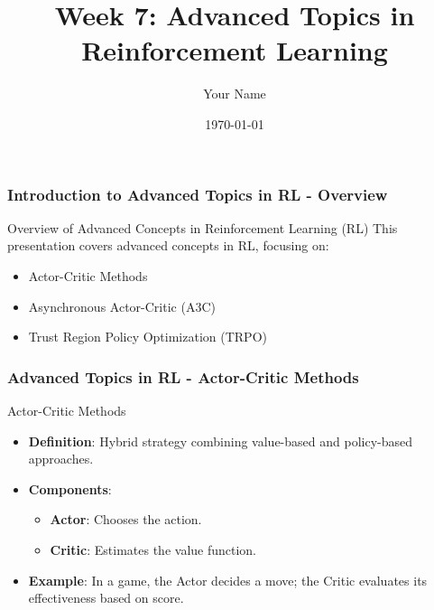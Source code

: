 \documentclass{beamer}
\title{Week 7: Advanced Topics in Reinforcement Learning}
\author{Your Name}
\institute{Your Institution}
\date{\today}
\begin{document}
\frame{\titlepage}

\begin{frame}[fragile]
    \frametitle{Introduction to Advanced Topics in RL - Overview}
    \begin{block}{Overview of Advanced Concepts in Reinforcement Learning (RL)}
        This presentation covers advanced concepts in RL, focusing on:
        \begin{itemize}
            \item Actor-Critic Methods
            \item Asynchronous Actor-Critic (A3C)
            \item Trust Region Policy Optimization (TRPO)
        \end{itemize}
    \end{block}
\end{frame}

\begin{frame}[fragile]
    \frametitle{Advanced Topics in RL - Actor-Critic Methods}
    \begin{block}{Actor-Critic Methods}
        \begin{itemize}
            \item \textbf{Definition}: Hybrid strategy combining value-based and policy-based approaches.
            \item \textbf{Components}:
                \begin{itemize}
                    \item \textbf{Actor}: Chooses the action.
                    \item \textbf{Critic}: Estimates the value function.
                \end{itemize}
            \item \textbf{Example}: 
                In a game, the Actor decides a move; the Critic evaluates its effectiveness based on score.
        \end{itemize}
    \end{block}
\end{frame}
\end{document}
